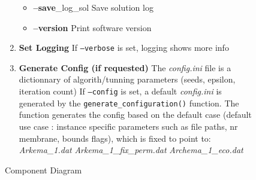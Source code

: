 \documentclass[12pt]{article}
\theoremstyle{definition}
\theoremstyle{definition}
\theoremstyle{remark}
\theoremstyle{remark}
\theoremstyle{definition}
\theoremstyle{remark}
\begin{document}
\begin{figure}[H]
\begin{minipage}{0.7\textwidth}
\begin{enumerate}
\begin{itemize}
					\item \textbf{--save}\_log\_sol           Save solution log                                       
					\item \textbf{--version}                Print software version                                  
				\end{itemize}
			\item \textbf{Set Logging} If \texttt{--verbose} is set, logging shows more info 
			\item \textbf{Generate Config (if requested)} The \emph{config.ini} file is a dictionnary of algorith/tunning parameters (seeds, epsilon, iteration count)
				If \texttt{--config} is set, a default \emph{config.ini} is generated by the \texttt{generate\_configuration()} function. The function generates the config based on the default case (default use case : instance specific parameters such as file paths, nr membrane, bounds flags), which is fixed to point to: \emph{Arkema\_1.dat} \emph{Arkema\_1\_fix\_perm.dat} \emph{Archema\_1\_eco.dat}
			\end{enumerate}
    \end{minipage}
    \caption{Component Diagram}
\end{figure}
\end{document}
